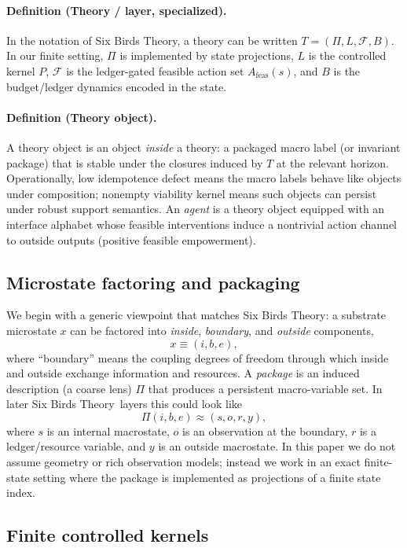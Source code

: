 \documentclass[11pt]{article}
\newcommand{\SBT}{Six Birds Theory}
\begin{document}
\paragraph{Definition (Theory / layer, specialized).}
In the notation of \SBT, a theory can be written $T=(\Pi,L,\mathcal F,B)$. In our finite setting, $\Pi$ is implemented by state projections, $L$ is the controlled kernel $P$, $\mathcal F$ is the ledger-gated feasible action set $A_{\mathrm{feas}}(s)$, and $B$ is the budget/ledger dynamics encoded in the state.

\paragraph{Definition (Theory object).}
A theory object is an object \emph{inside} a theory: a packaged macro label (or invariant package) that is stable under the closures induced by $T$ at the relevant horizon. Operationally, low idempotence defect means the macro labels behave like objects under composition; nonempty viability kernel means such objects can persist under robust support semantics. An \emph{agent} is a theory object equipped with an interface alphabet whose feasible interventions induce a nontrivial action channel to outside outputs (positive feasible empowerment).

\subsection{Microstate factoring and packaging}
We begin with a generic viewpoint that matches \SBT: a substrate microstate $x$ can be factored into \emph{inside}, \emph{boundary}, and \emph{outside} components,
\[
x \equiv (i,b,e),
\]
where ``boundary'' means the coupling degrees of freedom through which inside and outside exchange information and resources. A \emph{package} is an induced description (a coarse lens) $\Pi$ that produces a persistent macro-variable set. In later \SBT\ layers this could look like
\[
\Pi(i,b,e) \approx (s,o,r,y),
\]
where $s$ is an internal macrostate, $o$ is an observation at the boundary, $r$ is a ledger/resource variable, and $y$ is an outside macrostate. In this paper we do not assume geometry or rich observation models; instead we work in an exact finite-state setting where the package is implemented as projections of a finite state index.

\subsection{Finite controlled kernels}
\end{document}
